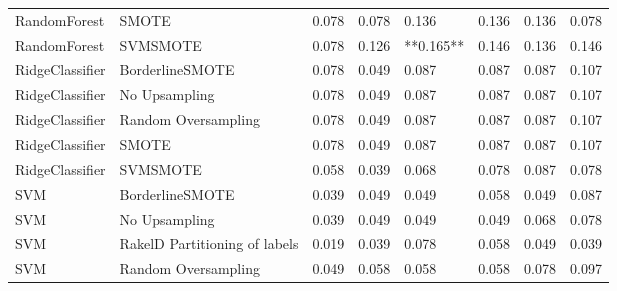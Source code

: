 \begin{tabular}{llllllll}
                   RandomForest &                         SMOTE & 0.078 &                     0.078 &                 0.136 &                  0.136 &                                   0.136 &    0.078 \\
                   RandomForest &                      SVMSMOTE & 0.078 &                     0.126 &             **0.165** &                  0.146 &                                   0.136 &    0.146 \\
                RidgeClassifier &               BorderlineSMOTE & 0.078 &                     0.049 &                 0.087 &                  0.087 &                                   0.087 &    0.107 \\
                RidgeClassifier &                 No Upsampling & 0.078 &                     0.049 &                 0.087 &                  0.087 &                                   0.087 &    0.107 \\
                RidgeClassifier &           Random Oversampling & 0.078 &                     0.049 &                 0.087 &                  0.087 &                                   0.087 &    0.107 \\
                RidgeClassifier &                         SMOTE & 0.078 &                     0.049 &                 0.087 &                  0.087 &                                   0.087 &    0.107 \\
                RidgeClassifier &                      SVMSMOTE & 0.058 &                     0.039 &                 0.068 &                  0.078 &                                   0.087 &    0.078 \\
                            SVM &               BorderlineSMOTE & 0.039 &                     0.049 &                 0.049 &                  0.058 &                                   0.049 &    0.087 \\
                            SVM &                 No Upsampling & 0.039 &                     0.049 &                 0.049 &                  0.049 &                                   0.068 &    0.078 \\
                            SVM & RakelD Partitioning of labels & 0.019 &                     0.039 &                 0.078 &                  0.058 &                                   0.049 &    0.039 \\
                            SVM &           Random Oversampling & 0.049 &                     0.058 &                 0.058 &                  0.058 &                                   0.078 &    0.097 \\

\end{tabular}
